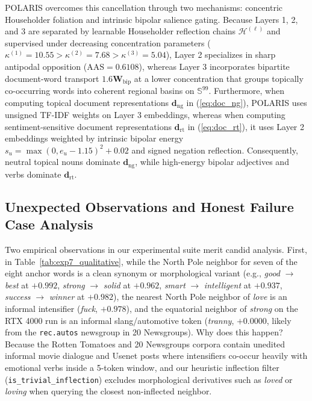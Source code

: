 \documentclass[journal]{IEEEtran}
\begin{document}
POLARIS overcomes this cancellation through two mechanisms: concentric Householder foliation and intrinsic bipolar salience gating. Because Layers 1, 2, and 3 are separated by learnable Householder reflection chains $\mathcal{H}^{(\ell)}$ and supervised under decreasing concentration parameters ($\kappa^{(1)} = 10.55 > \kappa^{(2)} = 7.68 > \kappa^{(3)} = 5.04$), Layer 2 specializes in sharp antipodal opposition ($\text{AAS} = 0.6108$), whereas Layer 3 incorporates bipartite document-word transport $1.6\mathbf{W}_{\text{bip}}$ at a lower concentration that groups topically co-occurring words into coherent regional basins on $\mathbb{S}^{99}$. Furthermore, when computing topical document representations $\mathbf{d}_{\text{ng}}$ in (\ref{eq:doc_ng}), POLARIS uses unsigned TF-IDF weights on Layer 3 embeddings, whereas when computing sentiment-sensitive document representations $\mathbf{d}_{\text{rt}}$ in (\ref{eq:doc_rt}), it uses Layer 2 embeddings weighted by intrinsic bipolar energy $s_u = \max(0, e_u - 1.15)^2 + 0.02$ and signed negation reflection. Consequently, neutral topical nouns dominate $\mathbf{d}_{\text{ng}}$, while high-energy bipolar adjectives and verbs dominate $\mathbf{d}_{\text{rt}}$.

\subsection{Unexpected Observations and Honest Failure Case Analysis}
Two empirical observations in our experimental suite merit candid analysis. First, in Table~\ref{tab:exp7_qualitative}, while the North Pole neighbor for seven of the eight anchor words is a clean synonym or morphological variant (e.g., \textit{good} $\to$ \textit{best} at $+0.992$, \textit{strong} $\to$ \textit{solid} at $+0.962$, \textit{smart} $\to$ \textit{intelligent} at $+0.937$, \textit{success} $\to$ \textit{winner} at $+0.982$), the nearest North Pole neighbor of \textit{love} is an informal intensifier (\textit{fuck}, $+0.978$), and the equatorial neighbor of \textit{strong} on the RTX 4000 run is an informal slang/automotive token (\textit{tranny}, $+0.0000$, likely from the \texttt{rec.autos} newsgroup in 20 Newsgroups). Why does this happen? Because the Rotten Tomatoes and 20 Newsgroups corpora contain unedited informal movie dialogue and Usenet posts where intensifiers co-occur heavily with emotional verbs inside a 5-token window, and our heuristic inflection filter (\texttt{is\_trivial\_inflection}) excludes morphological derivatives such as \textit{loved} or \textit{loving} when querying the closest non-inflected neighbor.
\end{document}
